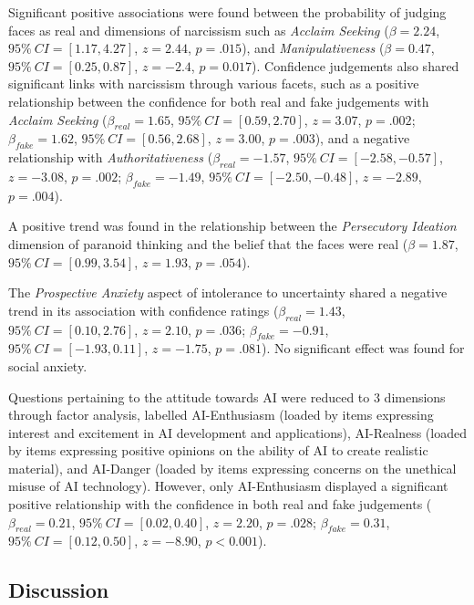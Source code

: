 \documentclass[
  man,mask,floatsintext]{apa6}
\begin{document}
Significant positive associations were found between the probability of judging faces as real and dimensions of narcissism such as \emph{Acclaim Seeking} (\(\beta = 2.24\), \(95\%~CI = [1.17, 4.27]\), \(z = 2.44\), \(p = .015\)), and \emph{Manipulativeness} (\(\beta = 0.47\), \(95\%~CI = [0.25, 0.87]\), \(z = -2.4\), \(p = 0.017\)). Confidence judgements also shared significant links with narcissism through various facets, such as a positive relationship between the confidence for both real and fake judgements with \emph{Acclaim Seeking} (\(\beta_{real} = 1.65\), \(95\%~CI = [0.59, 2.70]\), \(z = 3.07\), \(p =.002\); \(\beta_{fake} = 1.62\), \(95\%~CI = [0.56, 2.68]\), \(z = 3.00\), \(p = .003\)), and a negative relationship with \emph{Authoritativeness} (\(\beta_{real} = -1.57\), \(95\%~CI = [-2.58, -0.57]\), \(z = -3.08\), \(p = .002\); \(\beta_{fake} = -1.49\), \(95\%~CI = [-2.50, -0.48]\), \(z = -2.89\), \(p = .004\)).

A positive trend was found in the relationship between the \emph{Persecutory Ideation} dimension of paranoid thinking and the belief that the faces were real (\(\beta = 1.87\), \(95\%~CI = [0.99, 3.54]\), \(z = 1.93\), \(p = .054\)).

The \emph{Prospective Anxiety} aspect of intolerance to uncertainty shared a negative trend in its association with confidence ratings (\(\beta_{real} = 1.43\), \(95\%~CI = [0.10, 2.76]\), \(z = 2.10\), \(p = .036\); \(\beta_{fake} = -0.91\), \(95\%~CI = [-1.93, 0.11]\), \(z = -1.75\), \(p = .081\)). No significant effect was found for social anxiety.

Questions pertaining to the attitude towards AI were reduced to 3 dimensions through factor analysis, labelled AI-Enthusiasm (loaded by items expressing interest and excitement in AI development and applications), AI-Realness (loaded by items expressing positive opinions on the ability of AI to create realistic material), and AI-Danger (loaded by items expressing concerns on the unethical misuse of AI technology). However, only AI-Enthusiasm displayed a significant positive relationship with the confidence in both real and fake judgements (\(\beta_{real} = 0.21\), \(95\%~CI = [0.02, 0.40]\), \(z = 2.20\), \(p = .028\); \(\beta_{fake} = 0.31\), \(95\%~CI = [0.12, 0.50]\), \(z = -8.90\), \(p < 0.001\)).

\hypertarget{discussion}{%
\subsection{Discussion}\label{discussion}}
\end{document}
